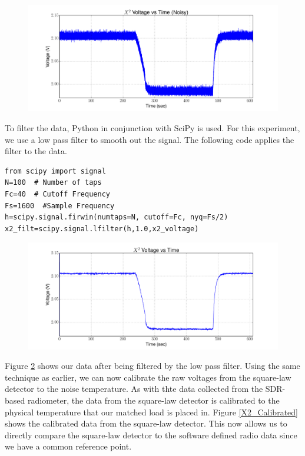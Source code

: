 {\begin{figure}[h!tb] \centering
\includegraphics[width=\textwidth]{Experiments/Exp1/noisy_voltage.pdf}
\label{X2_Raw}
\end{figure}

To filter the data, Python in conjunction with SciPy is used.  For this experiment, we use a low pass filter to smooth out the signal.  The following code applies the filter to the data.

\begin{lstlisting}[frame=single,keywordstyle=\color{blue}]
from scipy import signal
N=100  # Number of taps
Fc=40  # Cutoff Frequency
Fs=1600  #Sample Frequency
h=scipy.signal.firwin(numtaps=N, cutoff=Fc, nyq=Fs/2)
x2_filt=scipy.signal.lfilter(h,1.0,x2_voltage)
\end{lstlisting}

\begin{figure}[h!tb] \centering
\includegraphics[width=\textwidth]{Experiments/Exp1/x2_filter.pdf}
\label{X2_filter}
\end{figure}

Figure \ref{X2_filter} shows our data after being filtered by the low pass filter.  Using the same technique as earlier, we can now calibrate the raw voltages from the square-law detector to the noise temperature.  As with thte data collected from the SDR-based radiometer, the data from the square-law detector is calibrated to the physical temperature that our matched load is placed in.  Figure \ref{X2_Calibrated} shows the calibrated data from the square-law detector.  This now allows us to directly compare the square-law detector to the software defined radio data since we have a common reference point.

}
